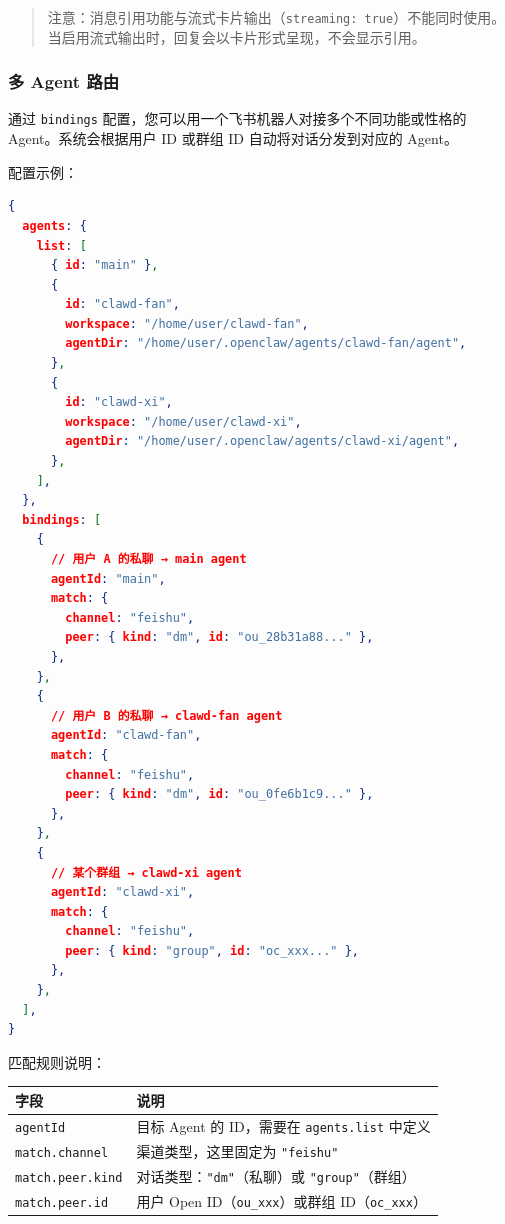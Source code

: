 \begin{quote}
注意：消息引用功能与流式卡片输出（\texttt{streaming: true}）不能同时使用。当启用流式输出时，回复会以卡片形式呈现，不会显示引用。
\end{quote}


\subsubsection{多 Agent 路由}


通过 \texttt{bindings} 配置，您可以用一个飞书机器人对接多个不同功能或性格的 Agent。系统会根据用户 ID 或群组 ID 自动将对话分发到对应的 Agent。

配置示例：

\begin{lstlisting}[language=json]
{
  agents: {
    list: [
      { id: "main" },
      {
        id: "clawd-fan",
        workspace: "/home/user/clawd-fan",
        agentDir: "/home/user/.openclaw/agents/clawd-fan/agent",
      },
      {
        id: "clawd-xi",
        workspace: "/home/user/clawd-xi",
        agentDir: "/home/user/.openclaw/agents/clawd-xi/agent",
      },
    ],
  },
  bindings: [
    {
      // 用户 A 的私聊 → main agent
      agentId: "main",
      match: {
        channel: "feishu",
        peer: { kind: "dm", id: "ou_28b31a88..." },
      },
    },
    {
      // 用户 B 的私聊 → clawd-fan agent
      agentId: "clawd-fan",
      match: {
        channel: "feishu",
        peer: { kind: "dm", id: "ou_0fe6b1c9..." },
      },
    },
    {
      // 某个群组 → clawd-xi agent
      agentId: "clawd-xi",
      match: {
        channel: "feishu",
        peer: { kind: "group", id: "oc_xxx..." },
      },
    },
  ],
}
\end{lstlisting}


匹配规则说明：


\begin{table}[h]
\centering
\small
\begin{tabular}{|l|l|}
\hline
字段 & 说明 \\
\hline
\texttt{agentId} & 目标 Agent 的 ID，需要在 \texttt{agents.list} 中定义 \\
\hline
\texttt{match.channel} & 渠道类型，这里固定为 \texttt{"feishu"} \\
\hline
\texttt{match.peer.kind} & 对话类型：\texttt{"dm"}（私聊）或 \texttt{"group"}（群组） \\
\hline
\texttt{match.peer.id} & 用户 Open ID（\texttt{ou\_xxx}）或群组 ID（\texttt{oc\_xxx}） \\
\hline
\end{tabular}
\end{table}



